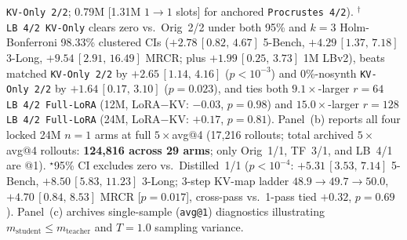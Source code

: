\documentclass[11pt]{article}
\newcommand{\ci}[2]{\,{\scriptsize\ensuremath{[#1,\,#2]}}}
\begin{document}
\begin{table}[t]
{\texttt{KV-Only~2/2}; 0.79M [1.31M $1{\to}1$ slots] for anchored \texttt{Procrustes~4/2}).
$^\dagger$\texttt{LB~4/2~KV-Only} clears zero vs.\ Orig~2/2 under both 95\% and $k{=}3$ Holm-Bonferroni 98.33\% clustered
CIs ($+2.78$\ci{0.82}{4.67} 5-Bench, $+4.29$\ci{1.37}{7.18} 3-Long, $+9.54$\ci{2.91}{16.49} MRCR; plus $+1.99$\ci{0.25}{3.73}
1M LBv2), beats matched \texttt{KV-Only~2/2} by $+2.65$\ci{1.14}{4.16} ($p{<}10^{-3}$) and 0\%-nosynth \texttt{KV-Only~2/2}
by $+1.64$\ci{0.17}{3.10} ($p{=}0.023$), and ties both $9.1\times$-larger $r{=}64$ \texttt{LB~4/2~Full-LoRA} (12M,
LoRA$-$KV: $-0.03$, $p{=}0.98$) and $15.0\times$-larger $r{=}128$ \texttt{LB~4/2~Full-LoRA} (24M, LoRA$-$KV: $+0.17$,
$p{=}0.81$).
Panel~(b) reports all four locked 24M $n{=}1$ arms at full $5\times$avg@4 (17,216 rollouts; total archived $5\times$avg@4
rollouts: \textbf{124,816 across 29 arms}; only Orig~1/1, TF~3/1, and LB~4/1 are @1). $^\star$95\% CI excludes zero vs.\
Distilled~1/1 ($p{<}10^{-4}$: $+5.31$\ci{3.53}{7.14} 5-Bench, $+8.50$\ci{5.83}{11.23} 3-Long; 3-step KV-map ladder
$48.9\to 49.7\to 50.0$, $+4.70$\ci{0.84}{8.53} MRCR [$p{=}0.017$], cross-pass vs.\ 1-pass tied $+0.32$, $p{=}0.69$).
Panel~(c) archives single-sample (\texttt{avg@1}) diagnostics illustrating $m_{\text{student}}\le m_{\text{teacher}}$ and
$T{=}1.0$ sampling variance.}
\label{tab:varloop}
\end{table}
\end{document}
